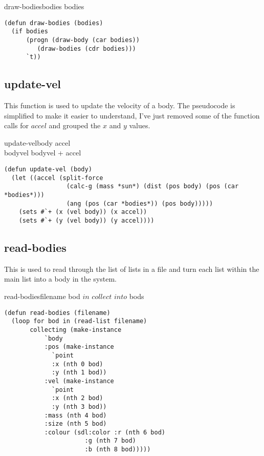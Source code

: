 \begin{pseudocode}{draw-bodies}{bodies}
	\IF bodies
	  \THEN 
	    \BEGIN
	    	 \\
	    \END
	  \ELSE
      	    \RETURN{\TRUE}	
\end{pseudocode}

\begin{lstlisting}
(defun draw-bodies (bodies)
  (if bodies
      (progn (draw-body (car bodies))
	     (draw-bodies (cdr bodies)))
      `t)) 
\end{lstlisting}

\subsection{update-vel}
This function is used to update the velocity of a body. The pseudocode is
simplified to make it easier to understand, I've just removed some of the
function calls for $accel$ and grouped the $x$ and $y$ values. 

\begin{pseudocode}{update-vel}{body}
	\BEGIN
	accel \GETS {} \\
	bodyvel \GETS bodyvel + accel
	\END
\end{pseudocode}

\begin{lstlisting}
(defun update-vel (body)
  (let ((accel (split-force 
                 (calc-g (mass *sun*) (dist (pos body) (pos (car *bodies*)))
                 (ang (pos (car *bodies*)) (pos body)))))
    (sets #`+ (x (vel body)) (x accel))
    (sets #`+ (y (vel body)) (y accel))))
\end{lstlisting}

\subsection{read-bodies}
This is used to read through the list of lists in a file and turn each list
within the main list into a body in the system. \\
\begin{pseudocode}{read-bodies}{filename}
	\FOREACH bod $ in $ 
	\DO $collect $  $ into $ bods\\
\end{pseudocode}

\begin{lstlisting}
(defun read-bodies (filename)
  (loop for bod in (read-list filename)
       collecting (make-instance 
		   `body
		   :pos (make-instance
			 `point
			 :x (nth 0 bod)
			 :y (nth 1 bod))
		   :vel (make-instance
			 `point
			 :x (nth 2 bod)	
			 :y (nth 3 bod))
		   :mass (nth 4 bod)
		   :size (nth 5 bod)
		   :colour (sdl:color :r (nth 6 bod)
				      :g (nth 7 bod)
				      :b (nth 8 bod)))))
\end{lstlisting}

